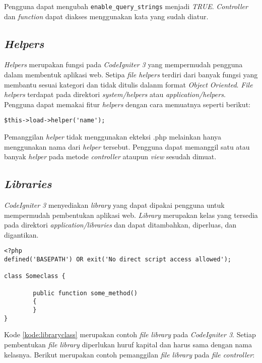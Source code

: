 Pengguna dapat mengubah \verb|enable_query_strings| menjadi \textit{TRUE}. \textit{Controller} dan \textit{function} dapat diakses menggunakan kata yang sudah diatur.

\subsection{\textit{Helpers}}
\textit{Helpers} merupakan fungsi pada \textit{CodeIgniter 3}
yang mempermudah pengguna dalam membentuk aplikasi web. Setipa \textit{file helpers} terdiri dari banyak fungsi yang membantu sesuai kategori dan tidak ditulis dalanm format \textit{Object Oriented}. \textit{File helpers} terdapat pada direktori \textit{system/helpers} atau \textit{application/helpers}. Pengguna dapat memakai fitur \textit{helpers} dengan cara memuatnya seperti berikut:

\begin{center}
\verb|$this->load->helper('name');|
\end{center}

Pemanggilan \textit{helper} tidak menggunakan ekteksi .php melainkan hanya menggunakan nama dari \textit{helper} tersebut. Pengguna dapat memanggil satu atau banyak \textit{helper} pada metode \textit{controller} ataupun \textit{view} sesudah dimuat.

\subsection{\textit{Libraries}}
\textit{CodeIgniter 3} menyediakan \textit{library} yang dapat dipakai pengguna untuk mempermudah pembentukan aplikasi web. \textit{Library} merupakan kelas yang tersedia pada direktori \textit{application/libraries} dan dapat ditambahkan, diperluas, dan digantikan. 

\begin{lstlisting}[caption=Contoh kelas \textit{library} pada \textit{CodeIgniter 3}, label=kode:libraryclass]
<?php
defined('BASEPATH') OR exit('No direct script access allowed');

class Someclass {

        public function some_method()
        {
        }
}
\end{lstlisting}

Kode \ref{kode:libraryclass} merupakan contoh \textit{file library} pada \textit{CodeIgniter 3}. Setiap pembentukan \textit{file library} diperlukan huruf kapital dan harus sama dengan nama kelasnya. Berikut merupakan contoh pemanggilan \textit{file library} pada \textit{file controller}:

